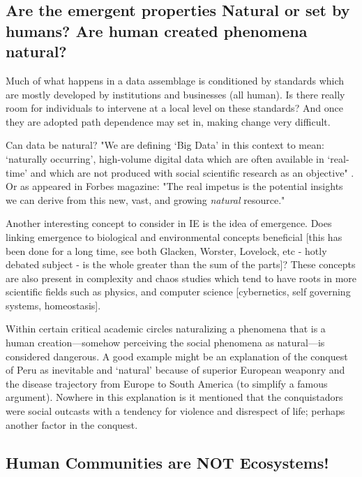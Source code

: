 \subsection{Are the emergent properties Natural or set by humans? Are human created phenomena natural?}

Much of what happens in a data assemblage is conditioned by standards which are mostly developed by institutions and businesses (all human). Is there really room for individuals to intervene at a local level on these standards? And once they are adopted path dependence may set in, making change very difficult.

Can data be natural? "We are defining ‘Big Data’ in this context to mean: ‘naturally occurring’, high-volume digital data which are often available in ‘real-time’ and which are not produced with social scientific research as an objective" \citep{ncrm_2015}. Or as appeared in Forbes magazine: "The real impetus is the potential insights we can derive from this new, vast, and growing \textit{natural} resource." \citep[][emphasis ours]{rotella_2012}

Another interesting concept to consider in IE is the idea of emergence. Does linking emergence to biological and environmental concepts beneficial [this has been done for a long time, see both Glacken, Worster, Lovelock, etc - hotly debated subject - is the whole greater than the sum of the parts]? These concepts are also present in complexity and chaos studies which tend to have roots in more scientific fields such as physics, and computer science [cybernetics, self governing systems, homeostasis].

Within certain critical academic circles naturalizing a phenomena that is a human creation—somehow perceiving the social phenomena as natural—is considered dangerous. A good example might be an explanation of the conquest of Peru as inevitable and ‘natural’ because of superior European weaponry and the disease trajectory from Europe to South America (to simplify a famous argument). Nowhere in this explanation is it mentioned that the conquistadors were social outcasts with a tendency for violence and disrespect of life; perhaps another factor in the conquest. 

\subsection{Human Communities are NOT Ecosystems!}

